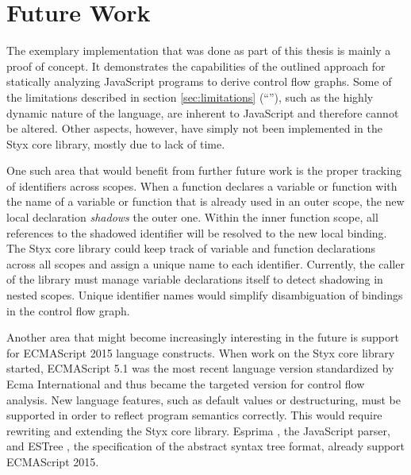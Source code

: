 \section{Future Work}

The exemplary implementation that was done as part of this thesis is mainly a proof of concept. It demonstrates the capabilities of the outlined approach for statically analyzing JavaScript programs to derive control flow graphs. Some of the limitations described in section \ref{sec:limitations} (``''), such as the highly dynamic nature of the language, are inherent to JavaScript and therefore cannot be altered. Other aspects, however, have simply not been implemented in the Styx core library, mostly due to lack of time.

One such area that would benefit from further future work is the proper tracking of identifiers across scopes. When a function declares a variable or function with the name of a variable or function that is already used in an outer scope, the new local declaration \emph{shadows} the outer one. Within the inner function scope, all references to the shadowed identifier will be resolved to the new local binding. The Styx core library could keep track of variable and function declarations across all scopes and assign a unique name to each identifier. Currently, the caller of the library must manage variable declarations itself to detect shadowing in nested scopes. Unique identifier names would simplify disambiguation of bindings in the control flow graph.

Another area that might become increasingly interesting in the future is support for ECMAScript 2015 \cite{es2015-spec} language constructs. When work on the Styx core library started, ECMAScript 5.1 \cite{es5-spec} was the most recent language version standardized by Ecma International and thus became the targeted version for control flow analysis. New language features, such as default values or destructuring, must be supported in order to reflect program semantics correctly. This would require rewriting and extending the Styx core library. Esprima \cite{esprima}, the JavaScript parser, and ESTree \cite{estree-spec}, the specification of the abstract syntax tree format, already support ECMAScript 2015.

